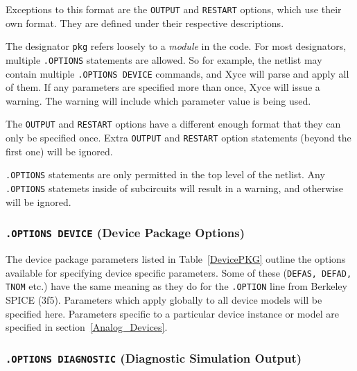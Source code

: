 \begin{Command}
\begin{Arguments}
\end{Arguments}

\comments

Exceptions to this format are the \texttt{OUTPUT} and \texttt{RESTART}
options, which use their own format. They are defined under their
respective descriptions.

The designator \texttt{pkg} refers loosely to a {\em module} in the code.  For most 
  designators, multiple \texttt{.OPTIONS} statements are allowed.  So for example, 
  the netlist may contain multiple \texttt{.OPTIONS DEVICE} commands, and Xyce will 
  parse and apply all of them.  If any parameters are specified more than once, Xyce
  will issue a warning.  The warning will include which parameter value is being 
  used. 

The \texttt{OUTPUT} and \texttt{RESTART} options have a different enough 
  format that they can only be specified once.  Extra \texttt{OUTPUT} 
  and \texttt{RESTART} option statements (beyond the first one) will be ignored.

\texttt{.OPTIONS} statements are only permitted in the top level of the netlist.    
Any \texttt{.OPTIONS} statemets inside of subcircuits will result in a warning, 
and otherwise will be ignored.

\end{Command}

\subsubsection{\texttt{.OPTIONS DEVICE} (Device Package Options)}

The device package parameters listed in Table~\ref{DevicePKG} outline the options
available for specifying device specific parameters.  Some of these (\texttt{DEFAS,
DEFAD, TNOM} etc.) have the same meaning as they do for
the \texttt{.OPTION} line from Berkeley SPICE (3f5).  Parameters which
apply globally to all device models will be specified here.
Parameters specific to a particular device instance or model are
specified in section~\ref{Analog_Devices}.



\subsubsection{\texttt{.OPTIONS DIAGNOSTIC} (Diagnostic Simulation Output)}

